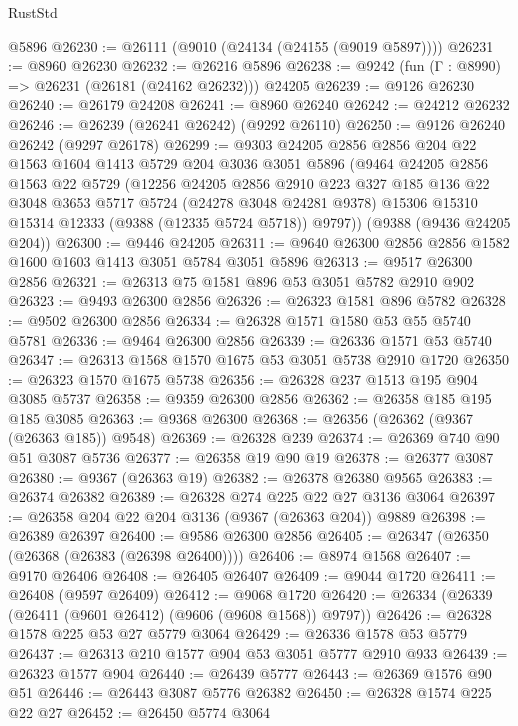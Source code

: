 \begin{lexlean}{RustStd}
\begin{coremodule}
    @5896
@26230 := @26111 (@9010 (@24134 (@24155 (@9019 @5897))))
@26231 := @8960 @26230
@26232 := @26216 @5896
@26238 := @9242 (fun (Γ : @8990) => @26231 (@26181 (@24162 @26232))) @24205
@26239 := @9126 @26230
@26240 := @26179 @24208
@26241 := @8960 @26240
@26242 := @24212 @26232
@26246 := @26239 (@26241 @26242) (@9292 @26110)
@26250 := @9126 @26240 @26242 (@9297 @26178)
@26299 := @9303
    @24205
    @2856
    @2856
    @204
    @22
    @1563
    @1604
    @1413
    @5729
    @204
    @3036
    @3051
    @5896
    (@9464
      @24205
      @2856
      @1563
      @22
      @5729
      (@12256
        @24205
        @2856
        @2910
        @223
        @327
        @185
        @136
        @22
        @3048
        @3653
        @5717
        @5724
        (@24278 @3048 @24281 @9378)
        @15306
        @15310
        @15314
        @12333
        (@9388 (@12335 @5724 @5718))
        @9797))
    (@9388 (@9436 @24205 @204))
@26300 := @9446 @24205
@26311 := @9640 @26300 @2856 @2856 @1582 @1600 @1603 @1413 @3051 @5784 @3051 @5896
@26313 := @9517 @26300 @2856
@26321 := @26313 @75 @1581 @896 @53 @3051 @5782 @2910 @902
@26323 := @9493 @26300 @2856
@26326 := @26323 @1581 @896 @5782
@26328 := @9502 @26300 @2856
@26334 := @26328 @1571 @1580 @53 @55 @5740 @5781
@26336 := @9464 @26300 @2856
@26339 := @26336 @1571 @53 @5740
@26347 := @26313 @1568 @1570 @1675 @53 @3051 @5738 @2910 @1720
@26350 := @26323 @1570 @1675 @5738
@26356 := @26328 @237 @1513 @195 @904 @3085 @5737
@26358 := @9359 @26300 @2856
@26362 := @26358 @185 @195 @185 @3085
@26363 := @9368 @26300
@26368 := @26356 (@26362 (@9367 (@26363 @185)) @9548)
@26369 := @26328 @239
@26374 := @26369 @740 @90 @51 @3087 @5736
@26377 := @26358 @19 @90 @19
@26378 := @26377 @3087
@26380 := @9367 (@26363 @19)
@26382 := @26378 @26380 @9565
@26383 := @26374 @26382
@26389 := @26328 @274 @225 @22 @27 @3136 @3064
@26397 := @26358 @204 @22 @204 @3136 (@9367 (@26363 @204)) @9889
@26398 := @26389 @26397
@26400 := @9586 @26300 @2856
@26405 := @26347 (@26350 (@26368 (@26383 (@26398 @26400))))
@26406 := @8974 @1568
@26407 := @9170 @26406
@26408 := @26405 @26407
@26409 := @9044 @1720
@26411 := @26408 (@9597 @26409)
@26412 := @9068 @1720
@26420 := @26334 (@26339 (@26411 (@9601 @26412) (@9606 (@9608 @1568)) @9797))
@26426 := @26328 @1578 @225 @53 @27 @5779 @3064
@26429 := @26336 @1578 @53 @5779
@26437 := @26313 @210 @1577 @904 @53 @3051 @5777 @2910 @933
@26439 := @26323 @1577 @904
@26440 := @26439 @5777
@26443 := @26369 @1576 @90 @51
@26446 := @26443 @3087 @5776 @26382
@26450 := @26328 @1574 @225 @22 @27
@26452 := @26450 @5774 @3064

\end{coremodule}
\end{lexlean}

